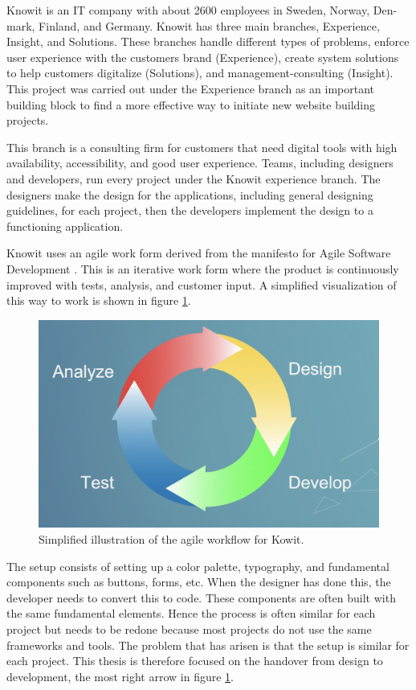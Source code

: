 Knowit is an IT company with about 2600 employees in Sweden, Norway, Den- mark, Finland, and Germany. Knowit has three main branches, Experience, Insight, and Solutions. These branches handle different types of problems, enforce user experience with the customers brand (Experience), create system solutions to help customers digitalize (Solutions), and management-consulting (Insight). This project was carried out under the Experience branch as an important building block to find a more effective way to initiate new website building projects. 

This branch is a consulting firm for customers that need digital tools with high availability, accessibility, and good user experience. Teams, including designers and developers, run every project under the Knowit experience branch. The designers make the design for the applications, including general designing guidelines, for each project, then the developers implement the design to a functioning application. 

Knowit uses an agile work form derived from the manifesto for Agile Software Development \cite{ManifestoAgileSoftware}. This is an iterative work form where the product is continuously improved with tests, analysis, and customer input. A simplified visualization of this way to work is shown in figure \ref{fig:agile}.

\begin{figure}[H]
  \centering
  \includegraphics[width=0.8\linewidth]{images/agile.png}
  \caption{Simplified illustration of the agile workflow for Kowit.}%
  \label{fig:agile}
\end{figure}

 The setup consists of setting up a color palette, typography, and fundamental \glspl{component} such as buttons, forms, etc. When the designer has done this, the developer needs to convert this to code. These components are often built with the same fundamental elements. Hence the process is often similar for each project but needs to be redone because most projects do not use the same frameworks and tools. The problem that has arisen is that the setup is similar for each project. This thesis is therefore focused on the handover from design to development, the most right arrow in figure \ref{fig:agile}.

